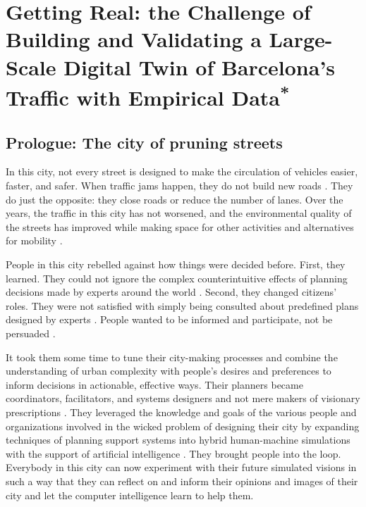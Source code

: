\chapter{Getting Real: the Challenge of Building and Validating a Large-Scale Digital Twin of Barcelona’s Traffic with Empirical Data\textsuperscript{*}}
\label{ch:getting_real}
\graphicspath{{chapters/02_getting_real/figures/}}

\section*{Prologue: The city of pruning streets}

In this city, not every street is designed to make the circulation of vehicles easier, faster, and safer. When traffic jams happen, they do not build new roads \citep{Duranton2011}. They do just the opposite: they close roads or reduce the number of lanes. Over the years, the traffic in this city has not worsened, and the environmental quality of the streets has improved while making space for other activities and alternatives for mobility \citep{Rueda2018}.

People in this city rebelled against how things were decided before. First, they learned. They could not ignore the complex counterintuitive effects \citep{Braess1969,Roughgarden2005} of planning decisions made by experts around the world \citep{Cairns2002,Chung2012,Kolata1990}. Second, they changed citizens’ roles. They were not satisfied with simply being consulted about predefined plans designed by experts \citep{Blundell-Jones2005}. People wanted to be informed and participate, not be persuaded \citep{Cardullo2019}.

It took them some time to tune their city-making processes and combine the understanding of urban complexity with people’s desires and preferences to inform decisions in actionable, effective ways. Their planners became coordinators, facilitators, and systems designers and not mere makers of visionary prescriptions \citep{Ratti2015}. They leveraged the knowledge and goals of the various people and organizations involved in the wicked problem of designing their city \citep{Rittel1973} by expanding techniques of planning support systems \citep{Geertman2020} into hybrid human-machine simulations \citep{Licklider1960,Negroponte1970} with the support of artificial intelligence \citep{Lock2021}. They brought people into the loop. Everybody in this city can now experiment with their future simulated visions in such a way that they can reflect on and inform their opinions and images of their city \citep{Lynch1960} and let the computer intelligence learn to help them.

